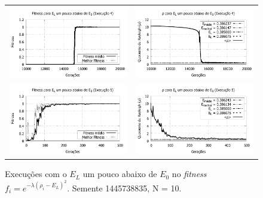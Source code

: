 \begin{figure}[p]
\begin{tabular}{@{}cc@{}}
		\includegraphics[width=.40\textwidth]{figs/resultados/variandoEL/T2E4_fitness-extendido.pdf} &
    \includegraphics[width=.40\textwidth]{figs/resultados/variandoEL/T2E4_rho_extendido.pdf}   \\
		
		\includegraphics[width=.40\textwidth]{figs/resultados/variandoEL/T2E5_fitness.pdf} &
    \includegraphics[width=.40\textwidth]{figs/resultados/variandoEL/T2E5_rho.pdf}

  \end{tabular}
  \caption{Execuções com o $E_L$ um pouco abaixo de $E_0$ no \textit{fitness} $f_i = e^{-\lambda(\rho_i - E_L)^2}$. Semente 1445738835, N = 10.}
	\label{fig:variando_EL_pouco_abaixo}
	\end{figure}

